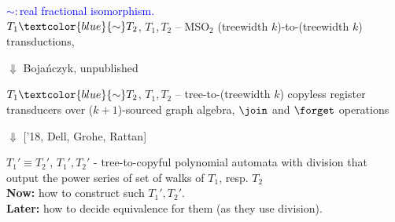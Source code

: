 \begin{frame}
\textcolor{blue}{$\sim:$real fractional isomorphism.}
\pause
\\
$T_1 \textcolor{blue}{\sim} T_2$, $T_1, T_2$ -- MSO$_2$ (treewidth $k$)-to-(treewidth $k$) transductions, 
\pause
\\
\begin{center}
	$\Downarrow$ Boja{\'n}czyk, unpublished
\end{center}
\pause
$T_1 \textcolor{blue}{\sim} T_2$, $T_1, T_2$ -- tree-to-(treewidth $k$) copyless register transducers over ($k+1$)-sourced graph algebra, $\join$ and $\forget$ operations
\pause
\begin{center}
	$\Downarrow$ \footnotesize{['18, Dell, Grohe, Rattan]}
\end{center}
\pause
$T_1' \equiv T_2'$, $T_1', T_2'$ - tree-to-\Zrat copyful polynomial automata with division that output the power series of set of walks of $T_1$, resp. $T_2$
\pause
\\
\textbf{Now: } how to construct such $T_1', T_2'$.
\pause
\\
\textbf{Later:\hspace{2pt}} how to decide equivalence for them (as they use division).
\end{frame}

